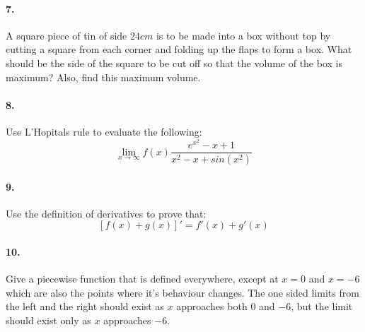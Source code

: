 \documentclass[12pt,oneside,oldfontcommands]{memoir}
\begin{document}
	\paragraph{7.}
	A square piece of tin of side $24cm$ is to be made into a box without top by cutting a square from each corner and folding up the flaps to form a box. What should be the side of the square to be cut off so that the volume of the box is maximum? Also, find this maximum volume.

	\paragraph{8.}
	Use L'Hopitals rule to evaluate the following:
	$$ \lim_{x\to\infty} f(x) \frac{e^{x^2}-x+1}{x^2-x+sin(x^2)}$$
	
	\paragraph{9.}
	Use the definition of derivatives to prove that:
	$$[f(x)+g(x)]' = f'(x)+g'(x)$$
	
	\paragraph{10.}
	Give a piecewise function that is defined everywhere, except at $x=0$ and $x=-6$ which are also the points where it's behaviour changes. The one sided limits from the left and the right should exist as $x$ approaches both $0$ and $-6$, but the limit should exist only as $x$ approaches $-6$.
\end{document}
